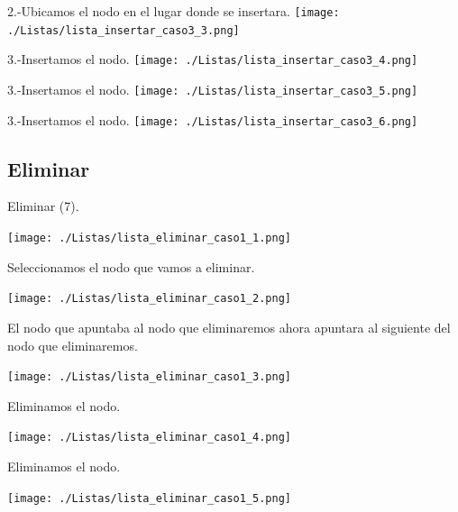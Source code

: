 \documentclass{beamer}
\begin{document}
\begin{frame}
  2.-Ubicamos el nodo en el lugar donde se insertara.
  \texttt{[image: ./Listas/lista\_insertar\_caso3\_3.png]}
  
\end{frame}

\begin{frame}
  3.-Insertamos el nodo.
  \texttt{[image: ./Listas/lista\_insertar\_caso3\_4.png]}  
   
  
\end{frame}

\begin{frame}
  3.-Insertamos el nodo.
  \texttt{[image: ./Listas/lista\_insertar\_caso3\_5.png]}  
   
  
\end{frame}

\begin{frame}
  3.-Insertamos el nodo.
  \texttt{[image: ./Listas/lista\_insertar\_caso3\_6.png]}  
   
  
\end{frame}


\subsection{Eliminar}

\begin{frame}
  Eliminar (7).
  
  \texttt{[image: ./Listas/lista\_eliminar\_caso1\_1.png]}
\end{frame}


\begin{frame}
  Seleccionamos el nodo que vamos a eliminar.
  
  \texttt{[image: ./Listas/lista\_eliminar\_caso1\_2.png]}
\end{frame}

\begin{frame}
  El nodo que apuntaba al nodo que eliminaremos ahora apuntara al siguiente del nodo que eliminaremos.
  
  \texttt{[image: ./Listas/lista\_eliminar\_caso1\_3.png]}
\end{frame}

\begin{frame}
  Eliminamos el nodo.
  
  \texttt{[image: ./Listas/lista\_eliminar\_caso1\_4.png]}
\end{frame}

\begin{frame}
  Eliminamos el nodo.
  
  \texttt{[image: ./Listas/lista\_eliminar\_caso1\_5.png]}
\end{frame}
\end{document}
